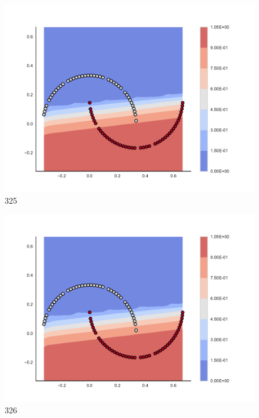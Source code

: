 \begin{subfigure}[b]{0.09\textwidth}
    \includegraphics[clip, trim=2.35cm 1.75cm 4.5cm 0cm,width=\textwidth]{img/convergence/325.pdf}
    \caption{325}
    \label{fig:convergence_325}
\end{subfigure}
%
\begin{subfigure}[b]{0.09\textwidth}
    \includegraphics[clip, trim=2.35cm 1.75cm 4.5cm 0cm,width=\textwidth]{img/convergence/326.pdf}
    \caption{326}
    \label{fig:convergence_326}
\end{subfigure}
%
